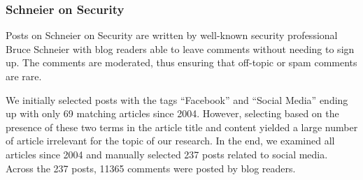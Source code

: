 
\subsubsection{Schneier on Security}
Posts on Schneier on Security are written by well-known security professional Bruce Schneier with blog readers able to leave comments without needing to sign up. The comments are moderated, thus ensuring that off-topic or spam comments are rare.

We initially selected posts with the tags ``Facebook'' and ``Social Media'' ending up with only 69 matching articles since 2004. However, selecting based on the presence of these two terms in the article title and content yielded a large number of article irrelevant for the topic of our research. In the end, we examined all articles since 2004 and manually selected 237 posts related to social media. Across the 237 posts, 11365 comments were posted by blog readers.

